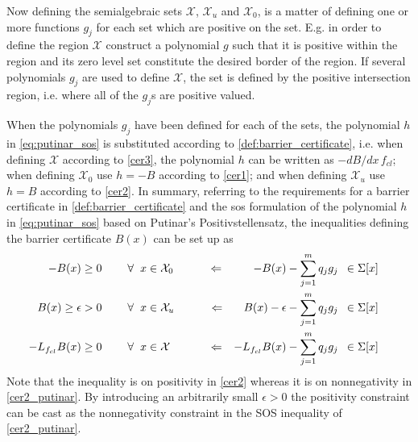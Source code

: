 Now defining the semialgebraic sets $\mathcal{X}$, $\mathcal{X}_u$ and $\mathcal{X}_0$, is a matter of defining one or more functions $g_j$ for each set which are positive on the set. E.g. in order to define the region $\mathcal{X}$ construct a polynomial $g$ such that it is positive within the region and its zero level set constitute the desired border of the region. If several polynomials $g_j$ are used to define $\mathcal{X}$, the set is defined by the positive intersection region, i.e. where all of the $g_j$s are positive valued.

When the polynomials $g_j$ have been defined for each of the sets, the polynomial $h$ in \autoref{eq:putinar_sos} is substituted according to \autoref{def:barrier_certificate}, i.e. when defining $\mathcal{X}$ according to \autoref{cer3}, the polynomial $h$ can be written as $-dB/d x \, f_{cl}$; when defining $\mathcal{X}_0$ use $h=-B$ according to \autoref{cer1}; and when defining $\mathcal{X}_u$ use $h=B$ according to \autoref{cer2}.
In summary, referring to the requirements for a barrier certificate in \autoref{def:barrier_certificate} and the \gls{sos} formulation of the polynomial $h$ in \autoref{eq:putinar_sos} based on Putinar's Positivstellensatz, the inequalities defining the barrier certificate $B(x)$ can be set up as
\begin{subequations}\label{eq:barrier_constraints_putinar}
\begin{flalign}
&&	-B(x) &\geq 0 \hspace{0.8cm}  \forall \hspace{2mm} x \in \mathcal{X}_0 \qquad\quad \Leftarrow& 	-B(x) - \sum _{j=1}^{m}q_jg_j &\,\,\,\in \Sigma[x] &&& \label{cer1_putinar}\\
&&	B(x) \geq\epsilon&> 0 \hspace{0.8cm}  \forall \hspace{2mm} x \in \mathcal{X}_u \qquad\quad \Leftarrow& 	B(x)-\epsilon - \sum _{j=1}^{m}q_jg_j &\,\,\,\in \Sigma[x] &&&\label{cer2_putinar} \\
&&	-L_{f_{cl}}B(x) &\geq 0 \hspace{0.8cm}  \forall \hspace{2mm} x \in \mathcal{X} \qquad\quad\,\, \Leftarrow& 	-L_{f_{cl}}B(x) - \sum _{j=1}^{m}q_jg_j &\,\,\,\in \Sigma[x] &&& \label{cer3_putinar}
\end{flalign}
\end{subequations}
Note that the inequality is on positivity in \autoref{cer2} whereas it is on nonnegativity in \autoref{cer2_putinar}. By introducing an arbitrarily small $\epsilon>0$ the positivity constraint can be cast as the nonnegativity constraint in the  SOS inequality of \autoref{cer2_putinar}. %

